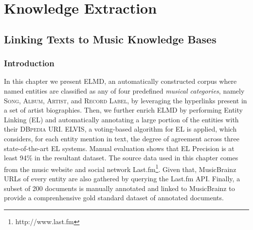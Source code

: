 \part{Knowledge Extraction}
\label{part:knowledge-extraction}

\chapter{Linking Texts to Music Knowledge Bases}
\label{sec:linking}


\section{Introduction}

In this chapter we present \textsc{ELMD}, an automatically constructed corpus where named entities are classified as any of four predefined \textit{musical categories}, namely \textsc{Song}, \textsc{Album}, \textsc{Artist}, and \textsc{Record Label}, by leveraging the hyperlinks present in a set of artist biographies. Then, we further enrich \textsc{ELMD} by performing Entity Linking (EL) and automatically annotating a large portion of the entities with their \textsc{DBpedia} URI. \textsc{ELVIS}, a voting-based algorithm for EL is applied, which considers, for each entity mention in text, the degree of agreement across three state-of-the-art EL systems. 
Manual evaluation shows that EL Precision is at least 94\% in the resultant dataset.
The source data used in this chapter comes from the music website and social network Last.fm\footnote{http://www.last.fm}. %
Given that, MusicBrainz URLs of every entity are also gathered by querying the Last.fm API.
Finally, a subset of 200 documents is manually annotated and linked to MusicBrainz to provide a comprenhensive gold standard dataset of annotated documents. 




